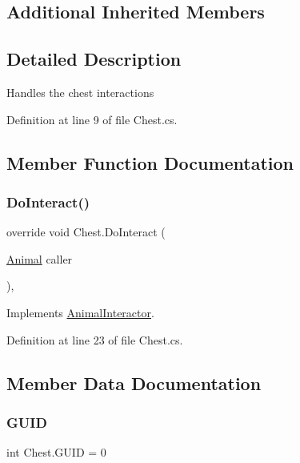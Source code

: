\subsection*{Additional Inherited Members}


\subsection{Detailed Description}
Handles the chest interactions 



Definition at line 9 of file Chest.\+cs.



\subsection{Member Function Documentation}
\mbox{\label{class_chest_a61fad29e7dd236a2fbfce7b9c2e51841}} 
\subsubsection{\texorpdfstring{Do\+Interact()}{DoInteract()}}
{\footnotesize\ttfamily override void Chest.\+Do\+Interact (\begin{DoxyParamCaption}\item[{\mbox{\hyperlink{class_animal}{Animal}}}]{caller }\end{DoxyParamCaption})\hspace{0.3cm}{\ttfamily [protected]}, {\ttfamily [virtual]}}



Implements \mbox{\hyperlink{class_animal_interactor_a522811ab410a5acbc12362e29263c5a8}{Animal\+Interactor}}.



Definition at line 23 of file Chest.\+cs.



\subsection{Member Data Documentation}
\mbox{\label{class_chest_ae844061d44904d0bf9ae41abf9aebaf9}} 
\subsubsection{\texorpdfstring{G\+U\+ID}{GUID}}
{\footnotesize\ttfamily int Chest.\+G\+U\+ID = 0}



